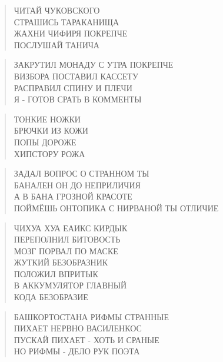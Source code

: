 \poemtitle{***}
\begin{verse}
ЧИТАЙ ЧУКОВСКОГО\\
СТРАШИСЬ ТАРАКАНИЩА\\
ЖАХНИ ЧИФИРЯ ПОКРЕПЧЕ\\
ПОСЛУШАЙ ТАНИЧА
\end{verse}

\poemtitle{***}
\begin{verse}
ЗАКРУТИЛ МОНАДУ С УТРА ПОКРЕПЧЕ\\
ВИЗБОРА ПОСТАВИЛ КАССЕТУ\\
РАСПРАВИЛ СПИНУ И ПЛЕЧИ\\
Я - ГОТОВ СРАТЬ В КОММЕНТЫ
\end{verse}

\poemtitle{***}
\begin{verse}
ТОНКИЕ НОЖКИ\\
БРЮЧКИ ИЗ КОЖИ\\
ПОПЫ ДОРОЖЕ\\
ХИПСТОРУ РОЖА
\end{verse}

\poemtitle{***}
\begin{verse}
ЗАДАЛ ВОПРОС О СТРАННОМ ТЫ\\
БАНАЛЕН ОН ДО НЕПРИЛИЧИЯ\\
А В БАНА ГРОЗНОЙ КРАСОТЕ \\
ПОЙМЁШЬ ОНТОПИКА С НИРВАНОЙ ТЫ ОТЛИЧИЕ
\end{verse}

\poemtitle{***}
\begin{verse}
ЧИХУА ХУА ЕАИКС КИРДЫК\\
ПЕРЕПОЛНИЛ БИТОВОСТЬ \\
МОЗГ ПОРВАЛ ПО МАСКЕ\\
ЖУТКИЙ БЕЗОБРАЗНИК\\
ПОЛОЖИЛ ВПРИТЫК\\
В АККУМУЛЯТОР ГЛАВНЫЙ\\
КОДА БЕЗОБРАЗИЕ
\end{verse}

\poemtitle{***}
\begin{verse}
БАШКОРТОСТАНА РИФМЫ СТРАННЫЕ\\
ПИХАЕТ НЕРВНО ВАСИЛЕНКОС\\
ПУСКАЙ ПИХАЕТ - ХОТЬ И СРАНЫЕ\\
НО РИФМЫ - ДЕЛО РУК ПОЭТА
\end{verse}

